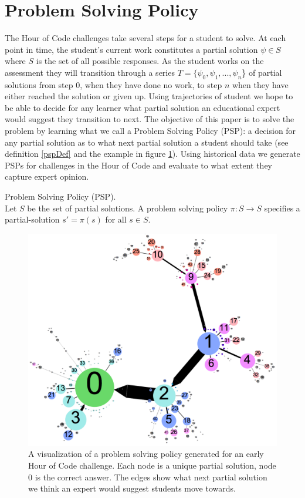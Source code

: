\section{Problem Solving Policy}

The Hour of Code challenges take several steps for a student to solve. At each point in time, the student's current work constitutes a partial solution $\psi \in S$ where $S$ is the set of all possible responses. As the student works on the assessment they will transition through a series $T = \{\psi_0, \psi_1, ... , \psi_n$\} of partial solutions from step $0$, when they have done no work, to step $n$ when they have either reached the solution or given up. Using trajectories of student we hope to be able to decide for any learner what partial solution an educational expert would suggest they transition to next. The objective of this paper is to solve the problem by learning what we call a Problem Solving Policy (PSP): a decision for any partial solution as to what next partial solution a student should take (see definition \ref{pspDef} and the example in figure \ref{fig:policy}). Using historical data we generate PSPs for challenges in the Hour of Code and evaluate to what extent they capture expert opinion.

\begin{defo}
Problem Solving Policy (PSP). \\ 
Let $S$ be the set of partial solutions.
A problem solving policy $\pi : S \rightarrow S$ specifies a partial-solution $s' = \pi(s)$ for all $s \in S$.
\label{pspDef}
\end{defo}

\begin{figure}
\centering
\includegraphics[width=1.0\columnwidth]{img/policy3}
\caption[Example problem solving policy]{A visualization of a problem solving policy generated for an early Hour of Code challenge. Each node is a unique partial solution, node 0 is the correct answer. The edges show what next partial solution we think an expert would suggest students move towards.}
\label{fig:policy}
\end{figure}

